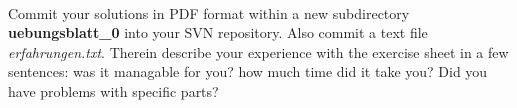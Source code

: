 \\
Commit your solutions in PDF format within a new subdirectory 
\textbf{uebungsblatt\_0\ExerciseSheetNumber} 
into your SVN repository. Also commit a text file 
\emph{erfahrungen.txt}. Therein describe your experience with the exercise sheet 
in a few sentences: was it managable for you? how much time did it take you? 
Did you have problems with specific parts?

